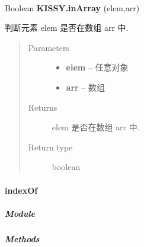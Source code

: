 \documentclass[letterpaper,10pt,english]{sphinxmanual}
\begin{document}
\begin{fulllineitems}
\label{api/seed/lang/inArray:Lang.KISSY.inArray}~
\begin{DUlineblock}{0em}
\item[] Boolean \textbf{KISSY.inArray} (elem,arr)
\item[] 判断元素 elem 是否在数组 arr 中.
\end{DUlineblock}
\begin{quote}\begin{description}
\item[{Parameters}] \leavevmode\begin{itemize}
\item {}
\textbf{elem} -- 任意对象

\item {}
\textbf{arr} -- 数组

\end{itemize}

\item[{Returns}] \leavevmode
elem 是否在数组 arr 中.

\item[{Return type}] \leavevmode
boolean

\end{description}\end{quote}

\end{fulllineitems}



\paragraph{indexOf}
\label{api/seed/lang/indexOf:indexof}\label{api/seed/lang/indexOf::doc}

\subparagraph{Module}
\label{api/seed/lang/indexOf:module}\begin{quote}

{\hyperref[api/seed/lang/index:module-Lang]{}}
\end{quote}


\subparagraph{Methods}
\label{api/seed/lang/indexOf:methods}
\end{document}
